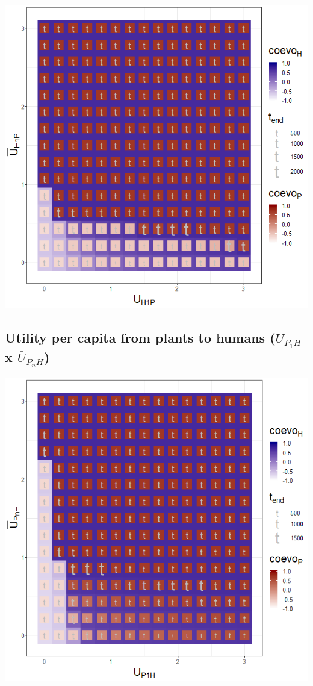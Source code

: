 \documentclass[]{book}
\begin{document}
\includegraphics[width=1\linewidth]{plots/3_twoPar-mU.H1P-mU.HnP_plot}

\newpage

\hypertarget{utility-per-capita-from-plants-to-humans-baru_p_1h-x-baru_p_nh}{%
\subsection{\texorpdfstring{Utility per capita from plants to humans (\(\bar{U}_{P_{1}H}\) x \(\bar{U}_{P_{n}H}\))}{Utility per capita from plants to humans (\textbackslash{}bar\{U\}\_\{P\_\{1\}H\} x \textbackslash{}bar\{U\}\_\{P\_\{n\}H\})}}\label{utility-per-capita-from-plants-to-humans-baru_p_1h-x-baru_p_nh}}


\includegraphics[width=1\linewidth]{plots/3_twoPar-mU.P1H-mU.PnH_plot}
\end{document}
